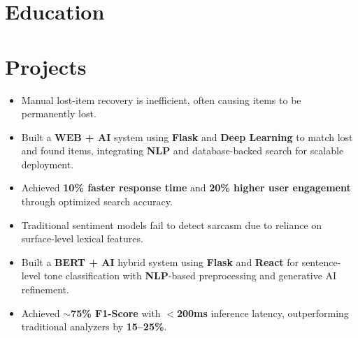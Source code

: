 \documentclass[11pt,a4paper,sans]{moderncv}
\begin{document}
\vspace{-0.3cm}
\section{Education} 


\vspace{-0.4cm} 
\section{Projects}
\vspace{-0.1cm}

\begin{itemize}
    \item Manual lost-item recovery is inefficient, often causing items to be permanently lost.
    \item Built a \textbf{WEB + AI} system using \textbf{Flask} and \textbf{Deep Learning} to match lost and found items,
    integrating \textbf{NLP} and database-backed search for scalable deployment.
    \item Achieved \textbf{10\% faster response time} and \textbf{20\% higher user engagement} through optimized search accuracy.
\end{itemize}


\begin{itemize}
    \item Traditional sentiment models fail to detect sarcasm due to reliance on surface-level lexical features.
    \item Built a \textbf{BERT +  AI} hybrid system using \textbf{Flask} and \textbf{React} for sentence-level
    tone classification with \textbf{NLP}-based preprocessing and generative AI refinement.
    \item Achieved \textbf{$\sim$75\% F1-Score} with \textbf{$<$200ms} inference latency, outperforming traditional analyzers by \textbf{15--25\%}.
\end{itemize}
    
\end{document}
